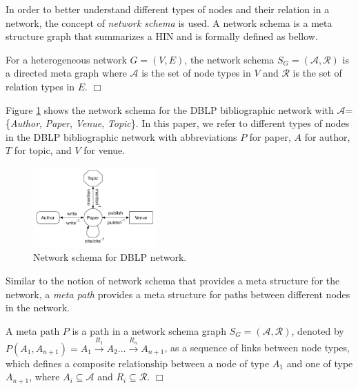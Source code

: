 In order to better understand different types of nodes and their relation in a network, the concept of \textit{network schema} \cite{sun2011pathsim} is used. A network schema is a meta structure graph that summarizes a HIN and is formally defined as bellow.

\begin{definition}
For a heterogeneous network $G=(V,E)$, the network schema $S_G=\mathcal{(A,R)}$ is a directed meta graph where $\mathcal{A}$ is the set of node types in $V$ and $\mathcal{R}$ is the set of relation types in $E$.  $\Box$
\end{definition}

Figure \ref{schema} shows the network schema for the DBLP bibliographic network with $\mathcal{A}$=\{\textit{Author}, \textit{Paper}, \textit{Venue}, \textit{Topic}\}. %
In this paper, we refer to different types of nodes in the DBLP bibliographic network with abbreviations $P$ for paper, $A$ for author, $T$ for topic, and $V$ for venue. 

\begin{figure}[t]
  \centering
      \includegraphics[trim = 0mm 10mm 0mm 0mm,width=0.42\textwidth]{figs/schema.pdf}
  \caption{Network schema for DBLP network.}\label{schema}
\end{figure}


Similar to the notion of network schema that provides a meta structure for the network, a \textit{meta path} \cite{sun2011pathsim} provides a meta structure for paths between different nodes in the network. 

\begin{definition}
A meta path $P$ is a path in a network schema graph $S_G = (\mathcal{A,R})$, denoted by $P(A_1,A_{n+1}) = A_1 \xrightarrow{R_1} A_2... \xrightarrow{R_n} A_{n+1}$, as a sequence of links between node types, which defines a composite relationship between a node of type $A_1$ and one of type $A_{n+1}$, where $A_i \subseteq \mathcal{A}$ and $R_i \subseteq \mathcal{R}$. $\Box$
\end{definition}

